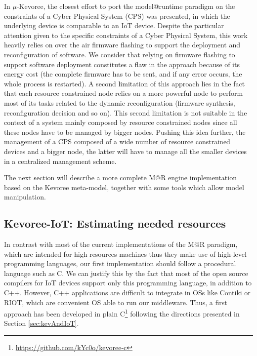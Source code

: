 In \cite{fouquet2012dynamic} $\mu$-Kevoree, the closest effort to port the model@runtime paradigm on the constraints of a Cyber Physical System (CPS) was presented, in which the underlying device is comparable to an IoT device.
Despite the particular attention given to the specific constraints of a Cyber Physical System, this work heavily relies on over the air firmware flashing to support the deployment and reconfiguration of software. 
We consider that relying on firmware flashing to support software deployment constitutes a flaw in the approach because of its energy cost (the complete firmware has to be sent, and if any error occurs, the whole process is restarted).
A second limitation of this approach lies in the fact that each resource constrained node relies on a more powerful node to perform most of its tasks related to the dynamic reconfiguration (firmware synthesis, reconfiguration decision and so on).
This second limitation is not suitable in the context of a system mainly composed by resource constrained nodes since all these nodes have to be managed by bigger nodes.
Pushing this idea further, the management of a CPS composed of a wide number of resource constrained devices and a bigger node, the latter will have to manage all the smaller devices in a centralized management scheme.

The next section will describe a more complete M@R engine implementation based on the Kevoree meta-model, together with some tools which allow model manipulation.

\subsection{Kevoree-IoT: Estimating needed resources}
\label{subsec:MARImpl}
In contrast with most of the current implementations of the M@R paradigm, which are intended for high resources machines thus they make use of high-level programming languages, our first implementation should follow a procedural language such as C.
We can justify this by the fact that most of the open source compilers for IoT devices support only this programming language, in addition to C++.
However, C++ applications are difficult to integrate in OSs like Contiki or RIOT, which are convenient OS able to run our middleware.
Thus, a first approach has been developed in plain C\footnote{\url{https://github.com/kYc0o/kevoree-c}} following the directions presented in Section \ref{sec:kevAndIoT}.

